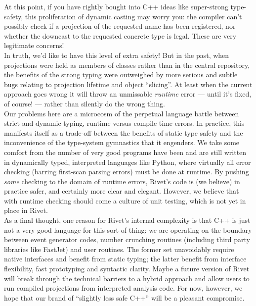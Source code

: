 \documentclass{JHEP3}
\begin{document}
\begin{philosophy}
  At this point, if you have rightly bought into C++ ideas like super-strong
  type-safety, this proliferation of dynamic casting may worry you: the compiler
  can't possibly check if a projection of the requested name has been
  registered, nor whether the downcast to the requested concrete type is
  legal. These are very legitimate concerns!\\

  In truth, we'd like to have this level of extra safety! But in the past, when
  projections were held as members of  classes rather
  than in the central  repository, the benefits of the
  strong typing were outweighed by more serious and subtle bugs relating to
  projection lifetime and object ``slicing''. At least when the current approach
  goes wrong it will throw an unmissable \emph{runtime} error --- until it's
  fixed, of course! --- rather than silently do  the wrong thing.\\

  Our problems here are a microcosm of the perpetual language battle between
  strict and dynamic typing, runtime versus compile time errors. In practice,
  this manifests itself as a trade-off between the benefits of static type
  safety and the inconvenience of the type-system gymnastics that it engenders.
  We take some comfort from the number of very good programs have been and are
  still written in dynamically typed, interpreted languages like Python, where
  virtually all error checking (barring first-scan parsing errors) must be done
  at runtime. By pushing \emph{some} checking to the domain of runtime errors,
  Rivet's code is (we believe) in practice safer, and certainly more clear and
  elegant. However, we believe that with runtime checking should come a culture
  of unit testing, which is not yet in place in Rivet.\\

  As a final thought, one reason for Rivet's internal complexity is that C++ is
  just not a very good language for this sort of thing: we are operating on the
  boundary between event generator codes, number crunching routines (including
  third party libraries like FastJet) and user routines. The former set
  unavoidably require native interfaces and benefit from static typing; the
  latter benefit from interface flexibility, fast prototyping and syntactic
  clarity. Maybe a future version of Rivet will break through the technical
  barriers to a hybrid approach and allow users to run compiled projections from
  interpreted analysis code. For now, however, we hope that our brand of
  ``slightly less safe C++'' will be a pleasant compromise.
\end{philosophy}
\end{document}
